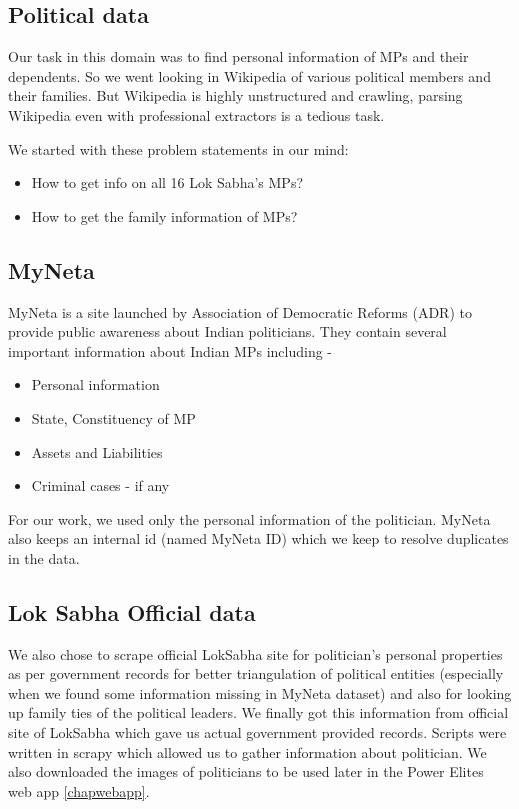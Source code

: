 \subsection{Political data}

Our task in this domain was to find personal information of MPs and their dependents. So we went looking in Wikipedia of various political members and their families. But Wikipedia is highly unstructured and crawling, parsing Wikipedia even with professional extractors is a tedious task.

We started with these problem statements in our mind:
\begin{itemize}
    \item How to get info on all 16 Lok Sabha's MPs?
    \item How to get the family information of MPs?
\end{itemize}
\subsection{MyNeta}
MyNeta is a site launched by Association of Democratic Reforms (ADR) to provide public awareness about Indian politicians. They contain several important information about Indian MPs including -
\begin{itemize}
    \item Personal information
    \item State, Constituency of MP
    \item Assets and Liabilities
    \item Criminal cases - if any
\end{itemize}
For our work, we used only the personal information of the politician. MyNeta also keeps an internal id (named MyNeta ID) which we keep to resolve duplicates in the data.

\subsection{Lok Sabha Official data}

We also chose to scrape official LokSabha site for politician's personal properties as per government records for better triangulation of political entities (especially when we found some information missing in MyNeta dataset) and also for looking up family ties of the political leaders.
We finally got this information from official site of LokSabha which gave us actual government provided records. Scripts were written in scrapy which allowed us to gather information about politician. We also downloaded the images of politicians to be used later in the Power Elites web app \ref{chapwebapp}.

